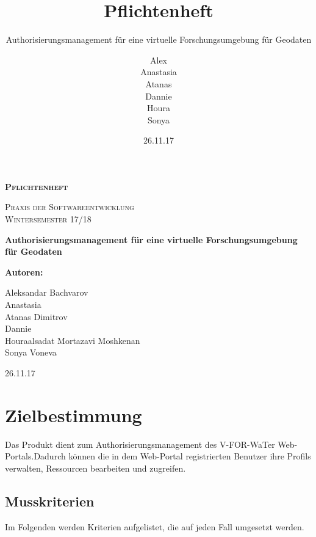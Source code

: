 \documentclass[parskip=full,11pt]{scrartcl}
\title{Pflichtenheft}
\subtitle{Authorisierungsmanagement für eine virtuelle Forschungsumgebung für Geodaten}
\author{Alex\\Anastasia\\Atanas\\Dannie\\ Houra\\Sonya\\}
\date{26.11.17}
\begin{document}
\begin{titlepage}
	
	\begin{center}
	{\scshape\LARGE\bfseries Pflichtenheft \par}
	\vspace{1cm}
	{\scshape\Large Praxis der Softwareentwicklung\\}
	\vspace{1cm}
	{\scshape\Large Wintersemester 17/18\\}
	\vspace{3cm}
	{\huge\bfseries Authorisierungsmanagement für eine virtuelle Forschungsumgebung für Geodaten\par}
	\vspace{2cm}
	\vfill
	{\bfseries {\Large Autoren}:\par}
	{\Large Aleksandar Bachvarov}\\
	{\Large Anastasia}\\%
	{\Large Atanas Dimitrov}\\
	{\Large Dannie}\\%
	{\Large Houraalsadat Mortazavi Moshkenan}\\
	{\Large Sonya Voneva}\\
	\vfill
	{\large 26.11.17 \par}
	\end{center}
\end{titlepage}
\tableofcontents

\newpage
\section{Zielbestimmung}
Das Produkt dient zum Authorisierungsmanagement des \gls{V-FOR-WaTer} Web-Portals.Dadurch können die in dem \gls{Web-Portal} registrierten \gls{Benutzer} ihre Profils verwalten, Ressourcen bearbeiten und zugreifen.

\subsection{Musskriterien}
Im Folgenden werden Kriterien aufgelistet, die auf jeden Fall umgesetzt werden.
\end{document}
